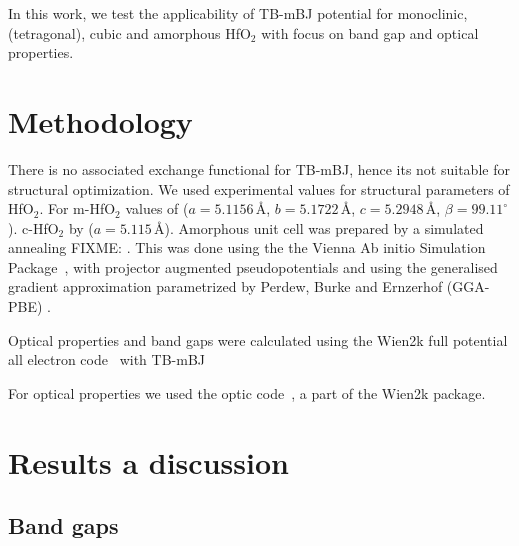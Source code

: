 \documentclass[10pt,a4paper,twocolumn]{article}
\begin{document}
In this work, we test the applicability of TB-mBJ potential for monoclinic, (tetragonal), cubic and amorphous HfO$_2$ with focus on band gap and optical properties.

\section{Methodology}

There is no associated exchange functional for TB-mBJ, hence its not suitable for structural optimization.
We used experimental values for structural parameters of HfO$_2$.
For m-HfO$_2$ values of \citet{Adam1959} ($a = 5.1156$\,\r{A}, $b = 5.1722$\,\r{A}, $c = 5.2948$\,\r{A}, $\beta = 99.11^\circ$).
c-HfO$_2$ by \citet{Dole1978277} ($a = 5.115$\,\r{A}).
Amorphous unit cell was prepared by a simulated annealing FIXME: .
This was done using the the Vienna Ab initio Simulation Package~\cite{Kresse1996}, with projector augmented pseudopotentials \cite{Kresse1999} and using the generalised gradient approximation parametrized by Perdew, Burke and Ernzerhof (GGA-PBE) \cite{Perdew1996}. 

Optical properties and band gaps were calculated using the Wien2k full potential all electron code~\cite{Blaha2001} with TB-mBJ


For optical properties we used the optic code~\cite{AmbroschDraxl2006}, a part of the Wien2k package.
 

\section{Results a discussion}

\subsection{Band gaps}
\end{document}
